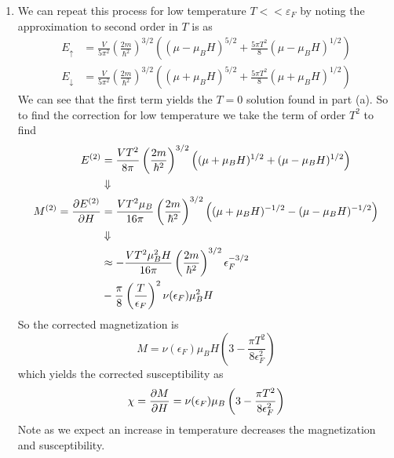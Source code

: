 \documentclass[11pt]{article}
\numberwithin{equation}{section}
\begin{document}
\begin{enumerate}[(1)]
\item We can repeat this process for low temperature $T<<\varepsilon_F$ by noting the 
approximation to second order in $T$ is as 
\begin{align*}
E_{\uparrow} &= \frac{V}{5\pi^2}\left(\frac{2m}{\hbar^2}\right)^{3/2}\left((\mu-\mu_BH)^{5/2} + \frac{5{\pi}T^2}{8}(\mu-\mu_BH)^{1/2}\right)\\
E_{\downarrow} &= \frac{V}{5\pi^2}\left(\frac{2m}{\hbar^2}\right)^{3/2}\left((\mu+\mu_BH)^{5/2} + \frac{5{\pi}T^2}{8}(\mu+\mu_BH)^{1/2}\right)
\end{align*}
We can see that the first term yields the $T=0$ solution found in part (a). So to find the
correction for low temperature we take the term of order $T^2$ to find
\begin{align*}
E^{(2)} &= \frac{VT^2}{8\pi}\left(\frac{2m}{\hbar^2}\right)^{3/2}\left((\mu+\mu_BH)^{1/2} + (\mu-\mu_BH)^{1/2}\right)\\
&\Downarrow\\
M^{(2)} = \frac{\partial{E^{(2)}}}{\partial{H}} &= \frac{VT^2\mu_B}{16\pi}\left(\frac{2m}{\hbar^2}\right)^{3/2}\left((\mu+\mu_BH)^{-1/2} - (\mu-\mu_BH)^{-1/2}\right)\\
&\Downarrow\\
&\approx  -\frac{VT^2\mu_B^2H}{16\pi}\left(\frac{2m}{\hbar^2}\right)^{3/2}\epsilon_F^{-3/2}\\
& -\frac{\pi}{8}\left(\frac{T}{\epsilon_F}\right)^{2}\nu(\epsilon_F)\mu_B^2H
\end{align*}
So the corrected magnetization is 
$$M = \nu(\epsilon_F)\mu_BH\left(3 - \frac{\pi T^2}{8\epsilon_F^2}\right)$$
which yields the corrected susceptibility as
$$\chi = \frac{\partial{M}}{\partial{H}} = \nu(\epsilon_F)\mu_B\left(3 - \frac{\pi T^2}{8\epsilon_F^2}\right)$$
Note as we expect an increase in temperature decreases the magnetization and susceptibility. 
\end{enumerate}

\pagebreak
\end{document}
